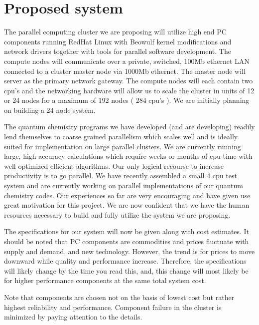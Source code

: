 \documentclass{article}
\begin{document}
\section{Proposed system}

The parallel computing cluster we are proposing will utilize high end PC
components running RedHat Linux with Beowulf kernel modifications and network
drivers together with tools for parallel software development. The compute
nodes will communicate over a private, switched, 100Mb ethernet LAN connected
to a cluster master node via 1000Mb ethernet. The master node will server as
the primary network gateway. The compute nodes will each contain two cpu's and
the networking hardware will allow us to scale the cluster in units of 12 or
24 nodes for a maximum of 192 nodes ( 284 cpu's ). We are initially planning
on building a 24 node system.

The quantum chemistry programs we have developed (and are developing) readily
lend themselves to coarse grained parallelism which scales well and is ideally
suited for implementation on large parallel clusters. We are currently running
large, high accuracy calculations which require weeks or months of cpu time
with well optimized efficient algorithms. Our only logical recourse to
increase productivity is to go parallel. We have recently assembled a small 4
cpu test system and are currently working on parallel implementations of our
quantum chemistry codes. Our experiences so far are very encouraging and have
given use great motivation for this project. We are now confident that we have
the human resources necessary to build and fully utilize the system we are proposing.

The specifications for our system will now be given along with cost estimates.
It should be noted that PC components are commodities and prices fluctuate
with supply and demand, and new technology. However, the trend is for prices
to move downward while quality and performance increase. Therefore, the
specifications will likely change by the time you read this, and, this change
will most likely be for higher performance components at the same total system cost.

Note that components are chosen not on the basis of lowest cost but rather
highest reliability and performance. Component failure in the cluster is
minimized by paying attention to the details.%
\end{document}
